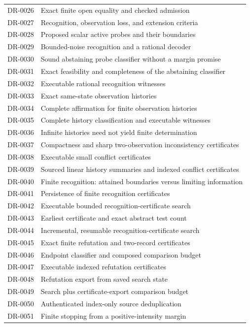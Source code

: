 \begin{longtable}{p{.14\linewidth}p{.79\linewidth}}
DR-0026 & Exact finite open equality and checked admission\\
DR-0027 & Recognition, observation loss, and extension criteria\\
DR-0028 & Proposed scalar active probes and their boundaries\\
DR-0029 & Bounded-noise recognition and a rational decoder\\
DR-0030 & Sound abstaining probe classifier without a margin promise\\
DR-0031 & Exact feasibility and completeness of the abstaining classifier\\
DR-0032 & Executable rational recognition witnesses\\
DR-0033 & Exact same-state observation histories\\
DR-0034 & Complete affirmation for finite observation histories\\
DR-0035 & Complete history classification and executable witnesses\\
DR-0036 & Infinite histories need not yield finite determination\\
DR-0037 & Compactness and sharp two-observation inconsistency certificates\\
DR-0038 & Executable small conflict certificates\\
DR-0039 & Sourced linear history summaries and indexed conflict certificates\\
DR-0040 & Finite recognition: attained boundaries versus limiting information\\
DR-0041 & Persistence of finite recognition certificates\\
DR-0042 & Executable bounded recognition-certificate search\\
DR-0043 & Earliest certificate and exact abstract test count\\
DR-0044 & Incremental, resumable recognition-certificate search\\
DR-0045 & Exact finite refutation and two-record certificates\\
DR-0046 & Endpoint classifier and composed comparison budget\\
DR-0047 & Executable indexed refutation certificates\\
DR-0048 & Refutation export from saved search state\\
DR-0049 & Search plus certificate-export comparison budget\\
DR-0050 & Authenticated index-only source deduplication\\
DR-0051 & Finite stopping from a positive-intensity margin\\

\end{longtable}
